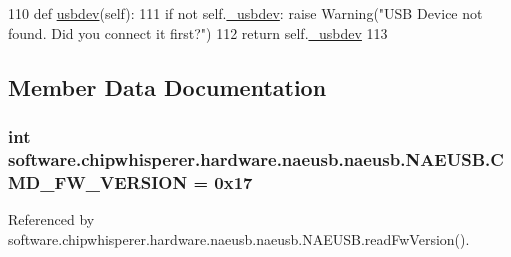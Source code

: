 \begin{DoxyCode}
110     \textcolor{keyword}{def }\hyperlink{classsoftware_1_1chipwhisperer_1_1hardware_1_1naeusb_1_1naeusb_1_1NAEUSB_a4cee25dcd50137094dc882f2c813f320}{usbdev}(self):
111         \textcolor{keywordflow}{if} \textcolor{keywordflow}{not} self.\hyperlink{classsoftware_1_1chipwhisperer_1_1hardware_1_1naeusb_1_1naeusb_1_1NAEUSB_a737b475b7fb2fb1959f134abce38e310}{\_usbdev}: \textcolor{keywordflow}{raise} Warning(\textcolor{stringliteral}{"USB Device not found. Did you connect it first?"})
112         \textcolor{keywordflow}{return} self.\hyperlink{classsoftware_1_1chipwhisperer_1_1hardware_1_1naeusb_1_1naeusb_1_1NAEUSB_a737b475b7fb2fb1959f134abce38e310}{\_usbdev}
113 
\end{DoxyCode}


\subsection{Member Data Documentation}
\hypertarget{classsoftware_1_1chipwhisperer_1_1hardware_1_1naeusb_1_1naeusb_1_1NAEUSB_a998f1478de45c8f74031f1b11b804206}{}
\subsubsection[{C\+M\+D\+\_\+\+F\+W\+\_\+\+V\+E\+R\+S\+I\+O\+N}]{\setlength{\rightskip}{0pt plus 5cm}int software.\+chipwhisperer.\+hardware.\+naeusb.\+naeusb.\+N\+A\+E\+U\+S\+B.\+C\+M\+D\+\_\+\+F\+W\+\_\+\+V\+E\+R\+S\+I\+O\+N = 0x17\hspace{0.3cm}{\ttfamily [static]}}\label{classsoftware_1_1chipwhisperer_1_1hardware_1_1naeusb_1_1naeusb_1_1NAEUSB_a998f1478de45c8f74031f1b11b804206}


Referenced by software.\+chipwhisperer.\+hardware.\+naeusb.\+naeusb.\+N\+A\+E\+U\+S\+B.\+read\+Fw\+Version().

\hypertarget{classsoftware_1_1chipwhisperer_1_1hardware_1_1naeusb_1_1naeusb_1_1NAEUSB_ab4975d566df0a1feb3f210cb7b7083cb}{}
